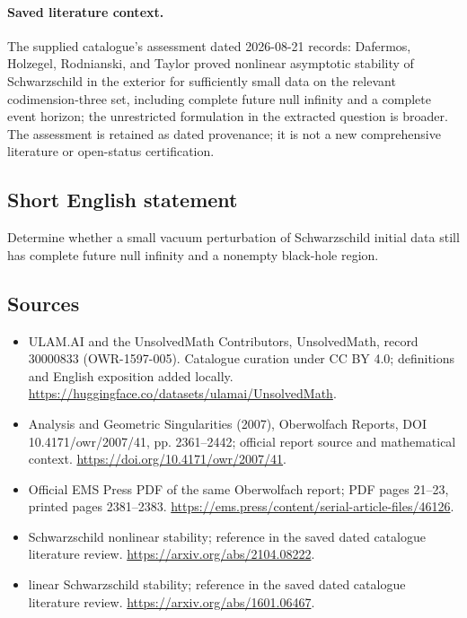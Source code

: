 \documentclass[11pt]{article}
\begin{document}
\paragraph{Saved literature context.} The supplied catalogue's assessment dated 2026-08-21 records: Dafermos, Holzegel, Rodnianski, and Taylor proved nonlinear asymptotic stability of Schwarzschild in the exterior for sufficiently small data on the relevant codimension-three set, including complete future null infinity and a complete event horizon; the unrestricted formulation in the extracted question is broader. The assessment is retained as dated provenance; it is not a new comprehensive literature or open-status certification.
\subsection{Short English statement}
Determine whether a small vacuum perturbation of Schwarzschild initial data still has complete future null infinity and a nonempty black-hole region.
\subsection{Sources}
\begin{itemize}
\item[\hypertarget{source:30000833:1}{S1}] ULAM.AI and the UnsolvedMath Contributors, UnsolvedMath, record 30000833 (OWR-1597-005). Catalogue curation under CC BY 4.0; definitions and English exposition added locally.
\url{https://huggingface.co/datasets/ulamai/UnsolvedMath}.
\item[\hypertarget{source:30000833:2}{S2}] Analysis and Geometric Singularities (2007), Oberwolfach Reports, DOI 10.4171/owr/2007/41, pp. 2361--2442; official report source and mathematical context.
\url{https://doi.org/10.4171/owr/2007/41}.
\item[\hypertarget{source:30000833:3}{S3}] Official EMS Press PDF of the same Oberwolfach report; PDF pages 21--23, printed pages 2381--2383.
\url{https://ems.press/content/serial-article-files/46126}.
\item[\hypertarget{source:30000833:4}{S4}] Schwarzschild nonlinear stability; reference in the saved dated catalogue literature review.
\url{https://arxiv.org/abs/2104.08222}.
\item[\hypertarget{source:30000833:5}{S5}] linear Schwarzschild stability; reference in the saved dated catalogue literature review.
\url{https://arxiv.org/abs/1601.06467}.
\end{itemize}
\label{end:30000833}
\end{document}

